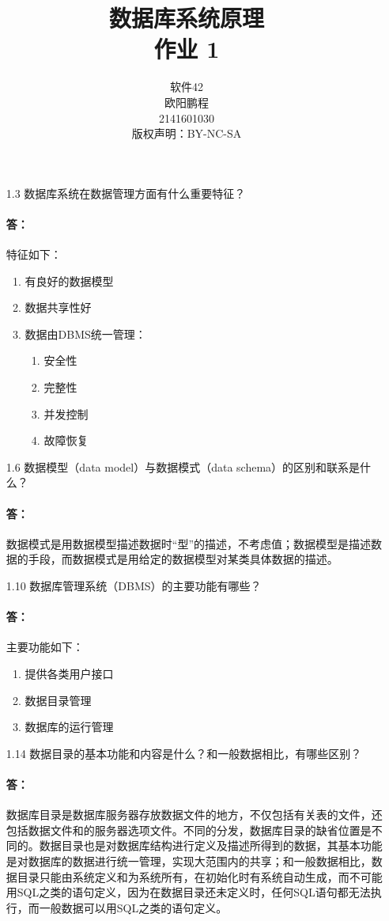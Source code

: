 \documentclass[UTF8]{ctexart}
\title{数据库系统原理 \\ 作业 1}
\author{软件42 \\ 欧阳鹏程 \\ 2141601030 \\ 版权声明：BY-NC-SA}
\begin{document}
\maketitle

\begin{itemize}
	\item[1.3] 数据库系统在数据管理方面有什么重要特征？
	\paragraph{答：}特征如下：
	\begin{enumerate}
		\item 有良好的数据模型
		\item 数据共享性好
		\item 数据由DBMS统一管理：
		\begin{enumerate}
			\item 安全性
			\item 完整性
			\item 并发控制
			\item 故障恢复
		\end{enumerate}
	\end{enumerate}

	\item[1.6] 数据模型（data model）与数据模式（data schema）的区别和联系是什么？
	\paragraph{答：}
	数据模式是用数据模型描述数据时“型”的描述，不考虑值；数据模型是描述数据的手段，而数据模式是用给定的数据模型对某类具体数据的描述。
	
	\item[1.10] 数据库管理系统（DBMS）的主要功能有哪些？
	\paragraph{答：}主要功能如下：
	\begin{enumerate}
		\item 提供各类用户接口
		\item 数据目录管理
		\item 数据库的运行管理
	\end{enumerate}

	\item[1.14] 数据目录的基本功能和内容是什么？和一般数据相比，有哪些区别？
	\paragraph{答：}数据库目录是数据库服务器存放数据文件的地方，不仅包括有关表的文件，还包括数据文件和的服务器选项文件。不同的分发，数据库目录的缺省位置是不同的。数据目录也是对数据库结构进行定义及描述所得到的数据，其基本功能是对数据库的数据进行统一管理，实现大范围内的共享；和一般数据相比，数据目录只能由系统定义和为系统所有，在初始化时有系统自动生成，而不可能用SQL之类的语句定义，因为在数据目录还未定义时，任何SQL语句都无法执行，而一般数据可以用SQL之类的语句定义。
\end{itemize}
\end{document}
